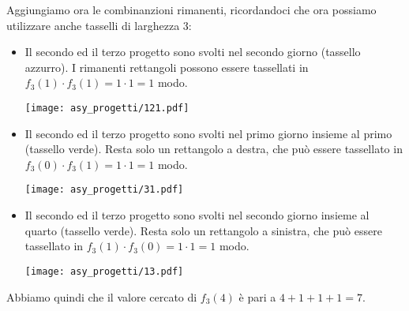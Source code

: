 \begin{solution}
Aggiungiamo ora le combinanzioni rimanenti, ricordandoci che ora possiamo utilizzare anche tasselli di larghezza 3:
\begin{itemize}
    \item Il secondo ed il terzo progetto sono svolti nel secondo giorno (tassello azzurro). I rimanenti rettangoli possono essere tassellati in $f_3(1) \cdot f_3(1)= 1 \cdot 1 =1$ modo.
    \begin{center}
    \texttt{[image: asy\_progetti/121.pdf]}
    \end{center}
    \item Il secondo ed il terzo progetto sono svolti nel primo giorno insieme al primo (tassello verde). Resta solo un rettangolo a destra, che può essere tassellato in $f_3(0) \cdot f_3(1)=1 \cdot 1 =1$ modo.
    \begin{center}
    \texttt{[image: asy\_progetti/31.pdf]}
    \end{center}
    \item Il secondo ed il terzo progetto sono svolti nel secondo giorno insieme al quarto (tassello verde). Resta solo un rettangolo a sinistra, che può essere tassellato in $f_3(1) \cdot f_3(0)=1 \cdot 1 =1$ modo.
    \begin{center}
    \texttt{[image: asy\_progetti/13.pdf]}
    \end{center}

\end{itemize}

Abbiamo quindi che il valore cercato di $f_3(4)$ è pari a $4 + 1 + 1 + 1 = 7$.

\Cppsol
\colorbox{white}{}
\end{solution}
